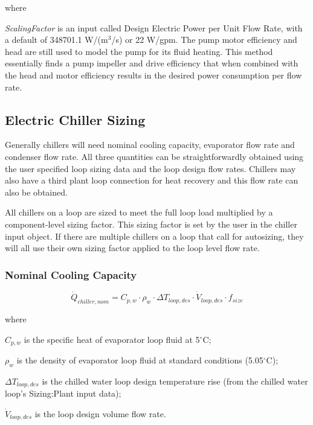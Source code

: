 where

\emph{ScalingFactor} is an input called Design Electric Power per Unit Flow Rate, with a default of 348701.1 W/(m\(^{3}\)/s) or 22 W/gpm. The pump motor efficiency and head are still used to model the pump for its fluid heating. This method essentially finds a pump impeller and drive efficiency that when combined with the head and motor efficiency results in the desired power consumption per flow rate.

\subsection{Electric Chiller Sizing}\label{electric-chiller-sizing}

Generally chillers will need nominal cooling capacity, evaporator flow rate and condenser flow rate. All three quantities can be straightforwardly obtained using the user specified loop sizing data and the loop design flow rates.  Chillers may also have a third plant loop connection for heat recovery and this flow rate can also be obtained.

All chillers on a loop are sized to meet the full loop load multiplied by a component-level sizing factor.  This sizing factor is set by the user in the chiller input object. If there are multiple chillers on a loop that call for autosizing, they will all use their own sizing factor applied to the loop level flow rate.

\subsubsection{Nominal Cooling Capacity}\label{nominal-cooling-capacity}

\begin{equation}
\dot Q_{chiller,nom} = C_{p,w} \cdot \rho_w \cdot \Delta T_{loop,des} \cdot \dot V_{loop,des} \cdot f_{size}
\end{equation}

where

\( C_{p,w} \) is the specific heat of evaporator loop fluid at 5\(^{\circ}\)C;

\( \rho_w \) is the density of evaporator loop fluid at standard conditions (5.05\(^{\circ}\)C);

\( \Delta T_{loop,des} \) is the chilled water loop design temperature rise (from the chilled water loop's Sizing:Plant input data);

\( \dot V_{loop,des} \) is the loop design volume flow rate.

